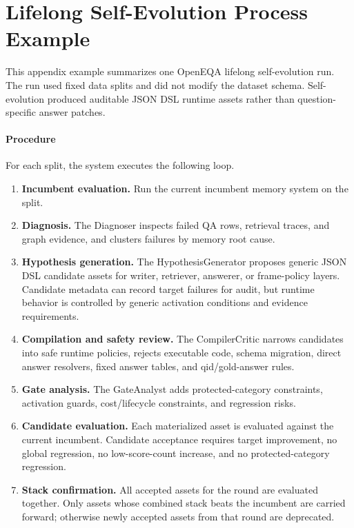 \section{Lifelong Self-Evolution Process Example}
\label{app:self_evo_process_example}

This appendix example summarizes one OpenEQA lifelong self-evolution run.
The run used fixed data splits and did not modify the dataset schema.
Self-evolution produced auditable JSON DSL runtime assets rather than question-specific answer patches.

\paragraph{Procedure}
For each split, the system executes the following loop.
\begin{enumerate}
    \item \textbf{Incumbent evaluation.} Run the current incumbent memory system on the split.
    \item \textbf{Diagnosis.} The Diagnoser inspects failed QA rows, retrieval traces, and graph evidence, and clusters failures by memory root cause.
    \item \textbf{Hypothesis generation.} The HypothesisGenerator proposes generic JSON DSL candidate assets for writer, retriever, answerer, or frame-policy layers. Candidate metadata can record target failures for audit, but runtime behavior is controlled by generic activation conditions and evidence requirements.
    \item \textbf{Compilation and safety review.} The CompilerCritic narrows candidates into safe runtime policies, rejects executable code, schema migration, direct answer resolvers, fixed answer tables, and qid/gold-answer rules.
    \item \textbf{Gate analysis.} The GateAnalyst adds protected-category constraints, activation guards, cost/lifecycle constraints, and regression risks.
    \item \textbf{Candidate evaluation.} Each materialized asset is evaluated against the current incumbent. Candidate acceptance requires target improvement, no global regression, no low-score-count increase, and no protected-category regression.
    \item \textbf{Stack confirmation.} All accepted assets for the round are evaluated together. Only assets whose combined stack beats the incumbent are carried forward; otherwise newly accepted assets from that round are deprecated.
\end{enumerate}

